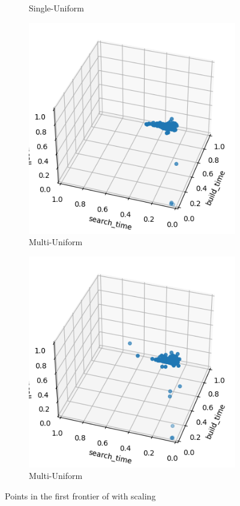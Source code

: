 \begin{figure}[ht]
\begin{subfigure}{0.24\textwidth}
        \caption{Single-Uniform}
    \end{subfigure}
    \hfill
    \begin{subfigure}{0.24\textwidth}
        \includegraphics[width=\textwidth]{../images/report/scaling-frontier-multi-unif.png}
        \caption{Multi-Uniform}
    \end{subfigure}
    \hfill
    \begin{subfigure}{0.24\textwidth}
        \includegraphics[width=\textwidth]{../images/report/scaling-frontier-multi-tour.png}
        \caption{Multi-Uniform}
    \end{subfigure}
    \hfill
    \caption{Points in the first frontier of with scaling}
    \label{fig:scaling-frontiers}
\end{figure}

